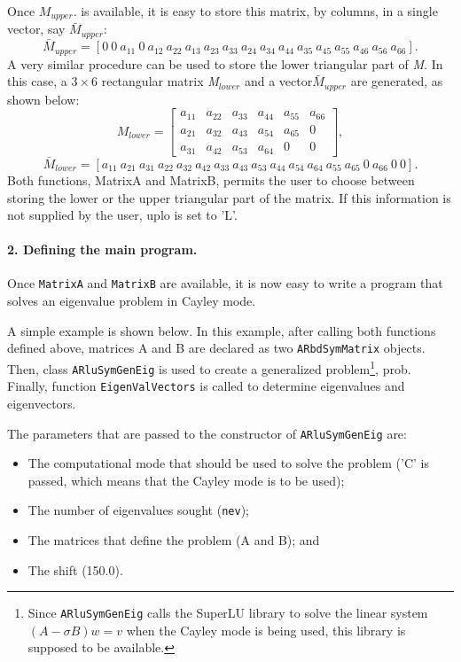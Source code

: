 Once $M_{upper}$. is available, it is easy to store this matrix, by columns, in a single vector, say $\bar{M}_{upper} $:
\[\bar{M}_{upper} =[0\ 0\ a_{11}\ 0\ a_{12}\ a_{22}\ a_{13}\ a_{23}\ a_{33}\ a_{24}\ a_{34}\ a_{44}\ a_{35}\ a_{45}\ a_{55}\ a_{46}\ a_{56}\ a_{66} ].\] 
A very similar procedure can be used to store the lower triangular part of \textit{M}. In this case, a $3\times 6$ rectangular matrix \textit{M${}_{lower}$} and a vector$\bar{M}_{upper} $ are generated, as shown below:
\[M_{lower} =\left[\begin{array}{cccccc} {a_{11} } & {a_{22} } & {a_{33} } & {a_{44} } & {a_{55} } & {a_{66} } \\ {a_{21} } & {a_{32} } & {a_{43} } & {a_{54} } & {a_{65} } & {0} \\ {a_{31} } & {a_{42} } & {a_{53} } & {a_{64} } & {0} & {0} \end{array}\right],\] 
\[\bar{M}_{lower} =[a_{11}\ a_{21}\ a_{31}\ a_{22}\ a_{32}\ a_{42}\ a_{33}\ a_{43}\ a_{53}\ a_{44}\ a_{54}\ a_{64}\ a_{55}\ a_{65}\ 0\ a_{66}\ 0\ 0].\] 
Both functions, MatrixA and MatrixB, permits the user to choose between storing the lower or the upper triangular part of the matrix. If this information is not supplied by the user, uplo is set to 'L'. 

\paragraph{2. Defining the main program.}

Once \texttt{MatrixA} and \texttt{MatrixB} are available, it is now easy to write a program that solves an eigenvalue problem in Cayley mode.

A simple example is shown below. In this example, after calling both functions defined above, matrices A and B are declared as two \texttt{ARbdSymMatrix} objects. Then, class \texttt{ARluSymGenEig} is used to create a generalized problem\footnote{Since \texttt{ARluSymGenEig} calls the SuperLU library to solve the linear system $(A-\sigma B)w = v$ when the Cayley mode is being used, this library is supposed to be available.}, prob. Finally, function \texttt{EigenValVectors} is called to determine eigenvalues and eigenvectors.

The parameters that are passed to the constructor of \texttt{ARluSymGenEig} are:
\begin{itemize}
	\item The computational mode that should be used to solve the problem (’C’ is passed, which means that the Cayley mode is to be used);
	\item The number of eigenvalues sought (\texttt{nev});
	\item The matrices that define the problem (A and B); and
	\item The shift (150.0).
\end{itemize}

